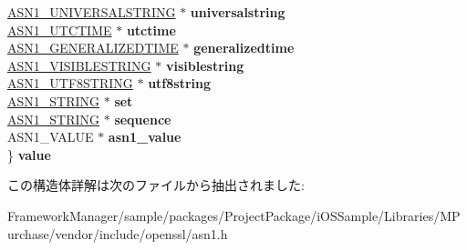 \begin{DoxyCompactItemize}
\begin{tabbing}
\>\hyperlink{structasn1__string__st}{ASN1\_UNIVERSALSTRING} $\ast$ {\bfseries universalstring}\\
\>\hyperlink{structasn1__string__st}{ASN1\_UTCTIME} $\ast$ {\bfseries utctime}\\
\>\hyperlink{structasn1__string__st}{ASN1\_GENERALIZEDTIME} $\ast$ {\bfseries generalizedtime}\\
\>\hyperlink{structasn1__string__st}{ASN1\_VISIBLESTRING} $\ast$ {\bfseries visiblestring}\\
\>\hyperlink{structasn1__string__st}{ASN1\_UTF8STRING} $\ast$ {\bfseries utf8string}\\
\>\hyperlink{structasn1__string__st}{ASN1\_STRING} $\ast$ {\bfseries set}\\
\>\hyperlink{structasn1__string__st}{ASN1\_STRING} $\ast$ {\bfseries sequence}\\
\>ASN1\_VALUE $\ast$ {\bfseries asn1\_value}\\
\} {\bfseries value}\label{structasn1__type__st_a202a9080533c352b4f0892bf39bdc581}
\\

\end{tabbing}\end{DoxyCompactItemize}


この構造体詳解は次のファイルから抽出されました\+:\begin{DoxyCompactItemize}
\item 
Framework\+Manager/sample/packages/\+Project\+Package/i\+O\+S\+Sample/\+Libraries/\+M\+Purchase/vendor/include/openssl/asn1.\+h\end{DoxyCompactItemize}
